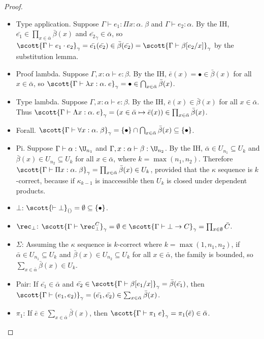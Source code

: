 \begin{proof}
\begin{itemize}
\item Type application. Suppose $\Gamma\vdash e_1:\Pi x:\alpha.\;\beta$ and $\Gamma\vdash e_2:\alpha$. By the IH, $\bar{e_1}\in\prod_{x\in \bar\alpha}\bar\beta(x)$ and $\bar{e_2}_\gamma\in\bar\alpha$, so $\scott{\Gamma\vdash e_1\cdot e_2}_\gamma=\bar{e_1}(\bar{e_2})\in\bar\beta(\bar{e_2})=\scott{\Gamma\vdash\beta[e_2/x]}_\gamma$ by the substitution lemma.
\item Proof lambda. Suppose $\Gamma,x:\alpha\vdash e:\beta$. By the IH, $\bar e(x)=\bullet\in\bar\beta(x)$ for all $x\in\bar\alpha$, so $\scott{\Gamma\vdash\lambda x:\alpha.\;e}_\gamma=\bullet\in\bigcap_{x\in \bar\alpha}\bar\beta(x)$.
\item Type lambda. Suppose $\Gamma,x:\alpha\vdash e:\beta$. By the IH, $\bar e(x)\in\bar\beta(x)$ for all $x\in\bar\alpha$. Thus $\scott{\Gamma\vdash\Lambda x:\alpha.\;e}_\gamma=(x\in\bar\alpha\mapsto\bar e(x))\in\prod_{x\in \bar\alpha}\bar\beta(x)$.
\item Forall. $\scott{\Gamma\vdash\forall x:\alpha.\;\beta}_\gamma=\{\bullet\}\cap\bigcap_{x\in \bar\alpha}\bar\beta(x)\subseteq\{\bullet\}$.
\item Pi. Suppose $\Gamma\vdash\alpha:\U_{n_1}$ and $\Gamma,x:\alpha\vdash\beta:\U_{n_2}$. By the IH, $\bar\alpha\in U_{n_1}\subseteq U_k$ and $\bar\beta(x)\in U_{n_2}\subseteq U_k$ for all $x\in\bar\alpha$, where $k=\max(n_1,n_2)$. Therefore $\scott{\Gamma\vdash\Pi x:\alpha.\;\beta}_\gamma=\prod_{x\in \bar\alpha}\bar\beta(x)\in U_k$, provided that the $\kappa$ sequence is $k$-correct, because if $\kappa_{k-1}$ is inaccessible then $U_k$ is closed under dependent products.
\item $\bot$: $\scott{\vdash\bot}_{()}=\emptyset\subseteq\{\bullet\}$.
\item $\rec_\bot$: $\scott{\Gamma\vdash\rec^C_\bot}_\gamma=\emptyset\in\scott{\Gamma\vdash\bot\to C}_\gamma=\prod_{x\in\emptyset}\bar C$.
\item $\Sigma$: Assuming the $\kappa$ sequence is $k$-correct where $k=\max(1,n_1,n_2)$, if $\bar\alpha\in U_{n_1}\subseteq U_k$ and $\bar\beta(x)\in U_{n_2}\subseteq U_k$ for all $x\in \bar\alpha$, the family is bounded, so $\sum_{x\in\bar\alpha}\bar\beta(x)\in U_k$.
\item Pair: If $\bar{e_1}\in\bar\alpha$ and $\bar{e_2}\in \scott{\Gamma\vdash\beta[e_1/x]}_\gamma=\bar\beta(\bar{e_1})$, then $\scott{\Gamma\vdash(e_1,e_2)}_\gamma=(\bar{e_1},\bar{e_2})\in \sum_{x\in\bar\alpha}\bar\beta(x)$.
\item $\pi_1$: If $\bar e\in \sum_{x\in\bar\alpha}\bar\beta(x)$, then $\scott{\Gamma\vdash\pi_1\;e}_\gamma=\pi_1(\bar e)\in\bar\alpha$.

\end{itemize}
\end{proof}
